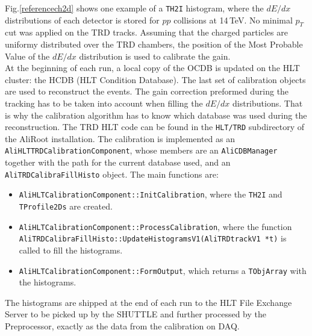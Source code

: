\documentclass{alicetdr}
\begin{document}
Fig.\ref{referencech2d} shows one example of a {\tt TH2I} histogram, 
where the $dE/dx$ distributions of each detector is stored for $pp$ 
collisions at 14\,TeV. No minimal $p_{T}$ cut was applied on the 
TRD tracks. Assuming that the charged particles are uniformy 
distributed over the TRD chambers, the position of the Most Probable 
Value of the $dE/dx$ distribution is used to calibrate the gain.\\ 
At the beginning of each run, a local copy of the OCDB is updated 
on the HLT cluster: the HCDB (HLT Condition Database). The last set 
of calibration objects are used to reconstruct the events. The gain 
correction preformed during the tracking has to be taken into account 
when filling the $dE/dx$ distributions. That is why the calibration 
algorithm has to know which database was used during the 
reconstruction. The TRD HLT code can be found in the {\tt HLT/TRD} 
subdirectory of the AliRoot installation. The calibration is 
implemented as an {\tt AliHLTTRDCalibrationComponent}, whose members 
are an {\tt AliCDBManager} together with the path for the current 
database used, and an {\tt AliTRDCalibraFillHisto} object. The main 
functions are:
\begin{itemize}
\item {\tt AliHLTCalibrationComponent::InitCalibration}, where the 
{\tt TH2I} and {\tt TProfile2Ds} are created.
\item {\tt AliHLTCalibrationComponent::ProcessCalibration}, where 
the function\\ 
{\tt AliTRDCalibraFillHisto::UpdateHistogramsV1(AliTRDtrackV1 *t)} 
is called to fill the histograms.
\item {\tt AliHLTCalibrationComponent::FormOutput}, which returns 
a {\tt TObjArray} with the histograms.
\end{itemize}     
The histograms are shipped at the end of each run to the HLT File 
Exchange Server to be picked up by the SHUTTLE and further processed 
by the Preprocessor, exactly as the data from the calibration on DAQ.
%
\end{document}
